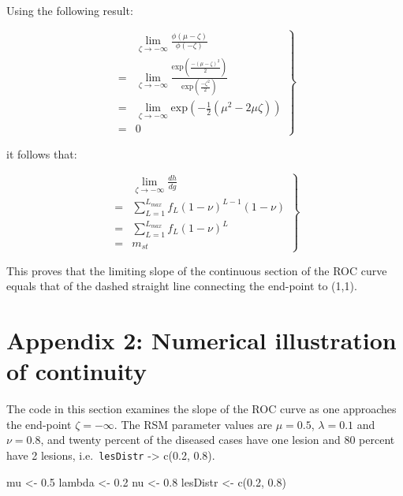 \documentclass[
]{book}
\newenvironment{Shaded}{\begin{snugshade}}{\end{snugshade}}
\newcommand{\FloatTok}[1]{\textcolor[rgb]{0.00,0.00,0.81}{#1}}
\newcommand{\FunctionTok}[1]{\textcolor[rgb]{0.00,0.00,0.00}{#1}}
\newcommand{\NormalTok}[1]{#1}
\newcommand{\OtherTok}[1]{\textcolor[rgb]{0.56,0.35,0.01}{#1}}
\begin{document}
Using the following result:

\begin{equation}
\left. 
\begin{aligned}
& \lim_{\zeta \rightarrow -\infty} \frac{\phi \left ( \mu-\zeta \right )}{\phi\left ( -\zeta \right )} \\ 
=&\lim_{\zeta \rightarrow -\infty} \frac{\text{exp}\left ( \frac{-\left (\mu-\zeta  \right )^2}{2} \right )}{\text{exp}\left ( \frac{-\zeta^2}{2} \right )} \\
=& \lim_{\zeta \rightarrow -\infty} \text{exp}\left (-\frac{1}{2} \left( \mu^2 - 2\mu\zeta \right)  \right ) \\
=& 0
\end{aligned}
\right \} 
\label{eq:rsm-predictions-slope-eq5}
\end{equation}

it follows that:

\begin{equation}
\left. 
\begin{aligned}
& \lim_{\zeta \rightarrow -\infty} \frac{dh}{dg} \\ 
=& \sum_{L=1}^{L_{max}} f_L \left ( 1-\nu \right )^{L-1} \left ( 1-\nu \right )\\
=& \sum_{L=1}^{L_{max}} f_L \left ( 1-\nu \right )^{L} \\
=& m_{st}
\end{aligned}
\right \} 
\label{eq:rsm-predictions-slope-eq6}
\end{equation}

This proves that the limiting slope of the continuous section of the ROC curve equals that of the dashed straight line connecting the end-point to (1,1).

\hypertarget{rsm-predictions-appendix2}{%
\section{Appendix 2: Numerical illustration of continuity}\label{rsm-predictions-appendix2}}

The code in this section examines the slope of the ROC curve as one approaches the end-point \(\zeta = -\infty\). The RSM parameter values are \(\mu = 0.5\), \(\lambda = 0.1\) and \(\nu = 0.8\), and twenty percent of the diseased cases have one lesion and 80 percent have 2 lesions, i.e.~\texttt{lesDistr} -\textgreater{} c(0.2, 0.8).

\begin{Shaded}
\begin{Highlighting}[]
\NormalTok{mu }\OtherTok{\textless{}{-}} \FloatTok{0.5}
\NormalTok{lambda }\OtherTok{\textless{}{-}} \FloatTok{0.2}
\NormalTok{nu }\OtherTok{\textless{}{-}} \FloatTok{0.8}
\NormalTok{lesDistr }\OtherTok{\textless{}{-}} \FunctionTok{c}\NormalTok{(}\FloatTok{0.2}\NormalTok{, }\FloatTok{0.8}\NormalTok{)}
\end{Highlighting}
\end{Shaded}
\end{document}
